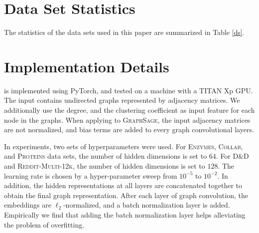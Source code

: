 \appendix

\section{Data Set Statistics}

The statistics of the data sets used in this paper are summarized in Table \ref{ds}.
\begin{table}[th!]
	\begin{center}
		\caption{Data set statistics and properties.}\label{dsstats}
			\label{ds}
		\end{center}
\end{table}

\section{Implementation Details}

\name is implemented using PyTorch, and tested on a machine with a TITAN Xp GPU. The input contains undirected graphs represented by adjacency matrices. We additionally use the degree, and the clustering coefficient as input feature for each node in the graphs.
When applying \name to \textsc{GraphSage}, the input adjacency matrices are not normalized, and bias terms are added to every graph convolutional layers.

In experiments, two sets of hyperparameters were used. For \textsc{Enzymes}, \textsc{Collab}, and \textsc{Proteins} data sets, the number of hidden dimensions is set to $64$. For \textsc{D\&D} and \textsc{Reddit-Multi-12k}, the number of hidden dimensions is set to $128$. The learning rate is chosen by a hyper-parameter sweep from $10^{-5}$ to $10^{-2}$.  In addition, the hidden representations at all layers are concatenated together to obtain the final graph representation.
After each layer of graph convolution, the embeddings are $\ell_2$-normalized, and a batch normalization layer is added. Empirically we find that adding the batch normalization layer helps alleviating the problem of overfitting.

